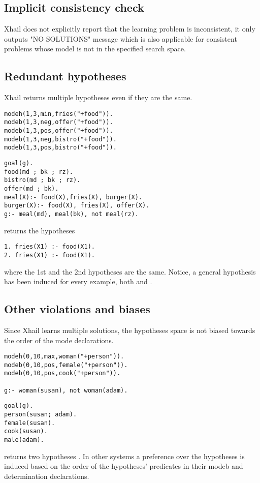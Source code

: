 \subsection{Implicit consistency check}
Xhail does not explicitly report that the learning problem is inconsistent, it only outputs "NO SOLUTIONS" message which is also applicable for consistent problems whose model is not in the specified search space.

\subsection{Redundant hypotheses}
Xhail returns multiple hypotheses even if they are the same.

\begin{minipage}[t]{.43\textwidth}
\begin{lstlisting}
modeh(1,3,min,fries("+food")).
modeb(1,3,neg,offer("+food")).
modeb(1,3,pos,offer("+food")).
modeb(1,3,neg,bistro("+food")).
modeb(1,3,pos,bistro("+food")).
\end{lstlisting}
\end{minipage}
\begin{minipage}[t]{.20\textwidth}
\begin{lstlisting}
goal(g).
food(md ; bk ; rz).
bistro(md ; bk ; rz).
offer(md ; bk).
meal(X):- food(X),fries(X), burger(X).
burger(X):- food(X), fries(X), offer(X).
g:- meal(md), meal(bk), not meal(rz).
\end{lstlisting}
\end{minipage}

returns the hypotheses

\begin{lstlisting}
1. fries(X1) :- food(X1).
2. fries(X1) :- food(X1).
\end{lstlisting}
where the 1st and the 2nd hypotheses are the same. Notice, a general hypothesis has been induced for every example, both  and .

\subsection{Other violations and biases}
Since Xhail learns multiple solutions, the hypotheses space is not biased towards the order of the mode declarations.

\begin{minipage}[t]{.50\textwidth}
\begin{lstlisting}
modeh(0,10,max,woman("+person")).
modeb(0,10,pos,female("+person")).
modeb(0,10,pos,cook("+person")).

g:- woman(susan), not woman(adam).
\end{lstlisting}
\end{minipage}
\begin{minipage}[t]{.20\textwidth}
\begin{lstlisting}
goal(g).
person(susan; adam).
female(susan).
cook(susan).
male(adam).
\end{lstlisting}
\end{minipage}

returns two hypotheses
. In other systems a preference over the hypotheses is induced based on the order of the hypotheses' predicates  in their modeb and determination declarations.
